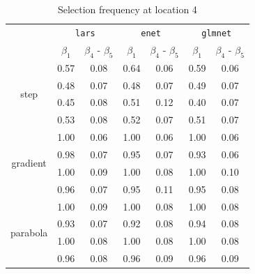 \documentclass[authoryear, review, 11pt]{elsarticle}
\begin{document}
		\begin{table}[ht]
		\begin{center}
		\begin{tabular}{ccc|cc|cc}
		& \multicolumn{2}{c}{\texttt{lars}} & \multicolumn{2}{c}{\texttt{enet}} & \multicolumn{2}{c}{\texttt{glmnet}} \\
		& $\beta_1$ & $\beta_4$ - $\beta_5$ & $\beta_1$ & $\beta_4$ - $\beta_5$ & $\beta_1$ & $\beta_4$ - $\beta_5$ \\ 
		  \cline{2-7}
		  \multirow{4}{*}{step} & 0.57 & 0.08 & 0.64 & 0.06 & 0.59 & 0.06 \\ 
		  & 0.48 & 0.07 & 0.48 & 0.07 & 0.49 & 0.07 \\ 
		  & 0.45 & 0.08 & 0.51 & 0.12 & 0.40 & 0.07 \\ 
		  & 0.53 & 0.08 & 0.52 & 0.07 & 0.51 & 0.07 \\ 
		  \cline{2-7}
		  \multirow{4}{*}{gradient} & 1.00 & 0.06 & 1.00 & 0.06 & 1.00 & 0.06 \\ 
		  & 0.98 & 0.07 & 0.95 & 0.07 & 0.93 & 0.06 \\ 
		  & 1.00 & 0.09 & 1.00 & 0.08 & 1.00 & 0.10 \\ 
		  & 0.96 & 0.07 & 0.95 & 0.11 & 0.95 & 0.08 \\ 
		  \cline{2-7}
		  \multirow{4}{*}{parabola} & 1.00 & 0.09 & 1.00 & 0.08 & 1.00 & 0.08 \\ 
		  & 0.93 & 0.07 & 0.92 & 0.08 & 0.94 & 0.08 \\ 
		  & 1.00 & 0.08 & 1.00 & 0.08 & 1.00 & 0.08 \\ 
		  & 0.96 & 0.08 & 0.96 & 0.09 & 0.96 & 0.09 \\ 
		  \end{tabular}
		\caption{Selection frequency at location 4\label{table:loc4-selection}}
		\end{center}
		\end{table}
\end{document}
